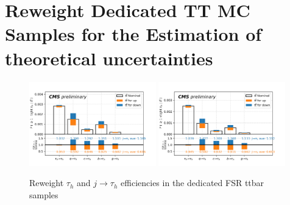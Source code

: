 \chapter{Reweight Dedicated TT MC Samples for the Estimation of theoretical uncertainties}

\begin{figure}
    \centering
    \includegraphics[width=0.49\textwidth]{appendices/ttSystReweighting/figures/2020_MCRatio_fsr_tauGenFlavor_tauTight.png}
    \includegraphics[width=0.49\textwidth]{appendices/ttSystReweighting/figures/2020_MCRatio_fsr_tauGenFlavor_tauVTight.png}
    \caption{Reweight $\tau_h$ and $j \to \tau_h$ efficiencies in the dedicated FSR ttbar samples}
    \label{fig:appendix:reweighttt:sf}
\end{figure}

